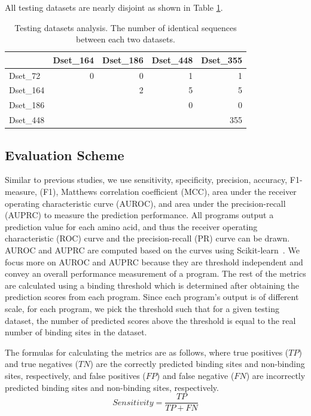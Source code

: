 All testing datasets are nearly disjoint as shown in Table \ref{tab:addlabel}.
\begin{table}[htbp]
  \centering
  \caption[Testing datasets analysis]{Testing datasets analysis. The number of identical sequences between each two datasets.}
    \begin{tabular}{|p{4.215em}|r|r|r|r|}
    \toprule
    \multicolumn{1}{|r|}{} & \multicolumn{1}{p{4.215em}|}{Dset\_164} & \multicolumn{1}{p{4.215em}|}{Dset\_186} & \multicolumn{1}{p{4.215em}|}{Dset\_448} & \multicolumn{1}{p{4.215em}|}{Dset\_355} \\
    \midrule
    Dset\_72 & 0     & 0     & 1     & 1 \\
    \midrule
    Dset\_164 &       & 2     & 5     & 5 \\
    \midrule
    Dset\_186 &       &       & 0     & 0 \\
    \midrule
    Dset\_448 &       &       &       & 355 \\
    \bottomrule
    \end{tabular}%
  \label{tab:addlabel}%
\end{table}%
\subsection{Evaluation Scheme \label{sec_evaluation_scheme}}
Similar to previous studies, we use sensitivity, specificity, precision, accuracy, F1-measure, (F1), Matthews correlation coefficient (MCC), area under the receiver operating characteristic curve (AUROC), and area under the precision-recall (AUPRC) to measure the prediction performance. All programs output a prediction value for each amino acid, and thus the receiver operating characteristic (ROC) curve and the precision-recall (PR) curve can be drawn. AUROC and AUPRC are computed based on the curves using Scikit-learn~\cite{scikit-learn}. We focus more on AUROC and AUPRC because they are threshold independent and convey an overall performance measurement of a program. The rest of the metrics are calculated using a binding threshold which is determined after obtaining the prediction scores from each program. Since each program's output is of different scale, for each program, we pick the threshold such that for a given testing dataset, the number of predicted scores above the threshold is equal to the real number of binding sites in the dataset. 

The formulas for calculating the metrics are as follows, where true positives ($TP$) and true negatives ($TN$) are the correctly predicted binding sites and non-binding sites, respectively, and false positives ($FP$) and false negative ($FN$) are incorrectly predicted binding sites and non-binding sites, respectively.
\begin{equation}
\textit{Sensitivity} = \frac{TP}{TP+FN}
\end{equation}

